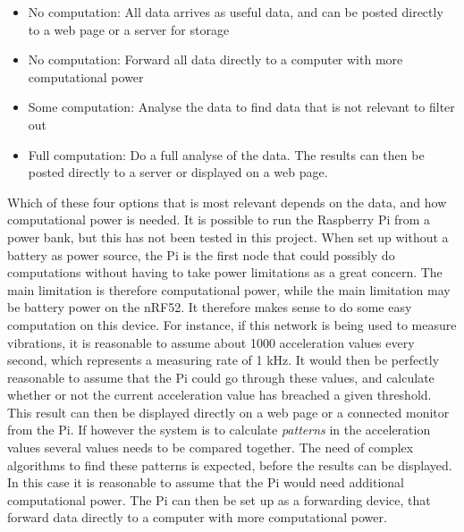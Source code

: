 \begin{itemize}
  \item No computation: All data arrives as useful data, and can be posted directly to a web page or a server for storage
  \item No computation: Forward all data directly to a computer with more computational power
  \item Some computation: Analyse the data to find data that is not relevant to filter out
  \item Full computation: Do a full analyse of the data. The results can then be posted directly to a server or displayed on a web page. 
\end{itemize}

Which of these four options that is most relevant depends on the data, and how computational power is needed. It is possible to run the Raspberry Pi from a power bank, but this has not been tested in this project. When set up without a battery as power source, the Pi is the first node that could possibly do computations without having to take power limitations as a great concern. The main limitation is therefore computational power, while the main limitation may be battery power on the nRF52. It therefore makes sense to do some easy computation on this device. For instance, if this network is being used to measure vibrations, it is reasonable to assume about 1000 acceleration values every second, which represents a measuring rate of 1 kHz. It would then be perfectly reasonable to assume that the Pi could go through these values, and calculate whether or not the current acceleration value has breached a given threshold. This result can then be displayed directly on a web page or a connected monitor from the Pi. If however the system is to calculate \textit{patterns} in the acceleration values several values needs to be compared together. The need of complex algorithms to find these patterns is expected, before the results can be displayed. In this case it is reasonable to assume that the Pi would need additional computational power. The Pi can then be set up as a forwarding device, that forward data directly to a computer with more computational power. 


